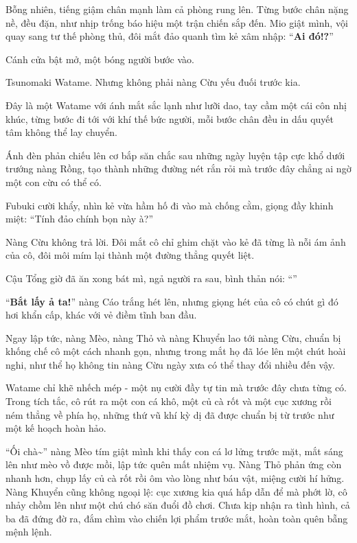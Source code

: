 \documentclass[../main.tex]{subfiles}
\begin{document}
Bỗng nhiên, tiếng giậm chân mạnh làm cả phòng rung lên. Từng bước chân nặng nề, đều đặn, như nhịp trống báo hiệu một trận chiến sắp đến. Mio giật mình, vội quay sang tư thế phòng thủ, đôi mắt đảo quanh tìm kẻ xâm nhập: ``\textbf{Ai đó!?}''

Cánh cửa bật mở, một bóng người bước vào.

Tsunomaki Watame. Nhưng không phải nàng Cừu yếu đuối trước kia.

Đây là một Watame với ánh mắt sắc lạnh như lưỡi dao, tay cầm một cái côn nhị khúc, từng bước đi tới với khí thế bức người, mỗi bước chân đều in dấu quyết tâm không thể lay chuyển.

Ánh đèn phản chiếu lên cơ bắp săn chắc sau những ngày luyện tập cực khổ dưới trướng nàng Rồng, tạo thành những đường nét rắn rỏi mà trước đây chẳng ai ngờ một con cừu có thể có.


Fubuki cười khẩy, nhìn kẻ vừa hầm hố đi vào mà chống cằm, giọng đầy khinh miệt: ``Tính đảo chính bọn này à?''

Nàng Cừu không trả lời. Đôi mắt cô chỉ ghim chặt vào kẻ đã từng là nỗi ám ảnh của cô, đôi môi mím lại thành một đường thẳng quyết liệt.

Cậu Tổng giờ đã ăn xong bát mì, ngả người ra sau, bình thản nói: ``''

``\textbf{Bắt lấy ả ta!}'' nàng Cáo trắng hét lên, nhưng giọng hét của cô có chút gì đó hơi khẩn cấp, khác với vẻ điềm tĩnh ban đầu.

Ngay lập tức, nàng Mèo, nàng Thỏ và nàng Khuyển lao tới nàng Cừu, chuẩn bị khống chế cô một cách nhanh gọn, nhưng trong mắt họ đã lóe lên một chút hoài nghi, như thể họ không tin nàng Cừu ngày xưa có thể thay đổi nhiều đến vậy.

Watame chỉ khẽ nhếch mép - một nụ cười đầy tự tin mà trước đây chưa từng có. Trong tích tắc, cô rút ra một con cá khô, một củ cà rốt và một cục xương rồi ném thẳng về phía họ, những thứ vũ khí kỳ dị đã được chuẩn bị từ trước như một kế hoạch hoàn hảo.

``Ối chà\~{}'' nàng Mèo tím giật mình khi thấy con cá lơ lửng trước mặt, mắt sáng lên như mèo vồ được mồi, lập tức quên mất nhiệm vụ. Nàng Thỏ phản ứng còn nhanh hơn, chụp lấy củ cà rốt rồi ôm vào lòng như báu vật, miệng cười hí hửng. Nàng Khuyển cũng không ngoại lệ: cục xương kia quá hấp dẫn để mà phớt lờ, cô nhảy chồm lên như một chú chó săn đuổi đồ chơi. Chưa kịp nhận ra tình hình, cả ba đã đứng đờ ra, đắm chìm vào chiến lợi phẩm trước mắt, hoàn toàn quên bẵng mệnh lệnh.
\end{document}

